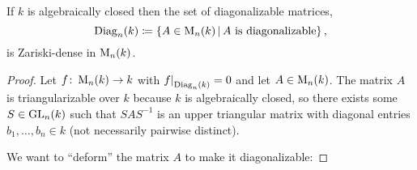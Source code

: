 \begin{proposition}
  \label{proposition: diagonalizable matrices are dense for algebraically closed}
  If $k$ is algebraically closed then the set of diagonalizable matrices,
  \[
              \Diag_n(k)
    \defined  \{
                A \in \Mat_n(k)
              \suchthat
                \text{$A$ is diagonalizable}
              \} \,,
  \]
  is Zariski-dense in $\operatorname{M}_n(k)$.
\end{proposition}


\begin{proof}
  Let $f \colon \operatorname{M}_n(k) \to k$ with $\restrict{f}{\Diag_n(k)} = 0$ and let $A \in \operatorname{M}_n(k)$.
  The matrix $A$ is triangularizable over $k$ because $k$ is algebraically closed, so there exists some $S \in \operatorname{GL}_n(k)$ such that $S A S^{-1}$ is an upper triangular matrix with diagonal entries $b_1, \dotsc, b_n \in k$ (not necessarily pairwise distinct).
  
  We want to \enquote{deform} the matrix $A$ to make it diagonalizable:
  

\end{proof}
